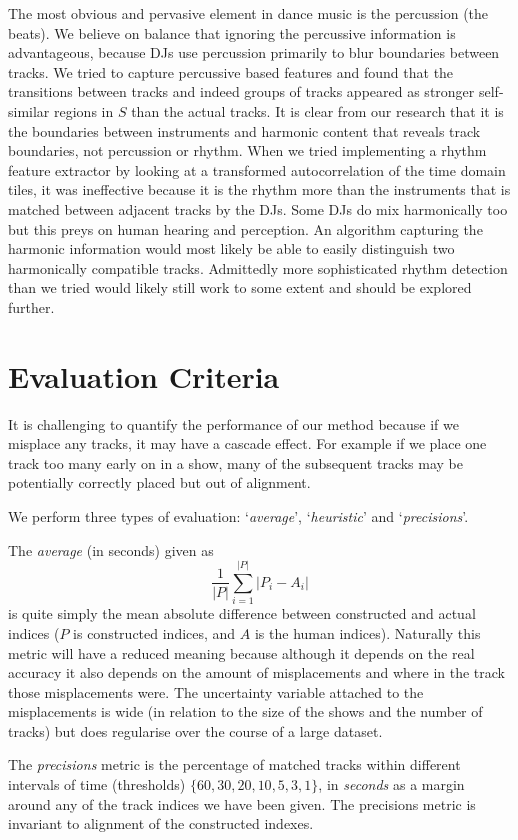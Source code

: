 \documentclass[twocolumn]{article}
\begin{document}
The most obvious and pervasive element in dance music is the percussion (the beats). We believe on balance that ignoring the percussive information is advantageous, because DJs use percussion primarily to blur boundaries between tracks.  We tried to capture percussive based features and found that the transitions between tracks and indeed groups of tracks appeared as stronger self-similar regions in $S$ than the actual tracks. It is clear from our research that it is the boundaries between instruments and harmonic content that reveals track boundaries, not percussion or rhythm. When we tried implementing a rhythm feature extractor by looking at a transformed autocorrelation of the time domain tiles, it was ineffective because it is the rhythm more than the instruments that is matched between adjacent tracks by the DJs. Some DJs do mix harmonically too but this preys on human hearing and perception. An algorithm capturing the harmonic information would most likely be able to easily distinguish two harmonically compatible tracks. Admittedly more sophisticated rhythm detection than we tried would likely still work to some extent and should be explored further. 


\section{Evaluation Criteria}\label{eval_crit}

It is challenging to quantify the performance of our method because if we misplace any tracks, it may have a cascade effect. For example if we place one track too many early on in a show, many of the subsequent tracks may be potentially correctly placed but out of alignment. 

We perform three types of evaluation: `\textit{average}', `\textit{heuristic}' and `\textit{precisions}'.


The \textit{average} (in seconds) given as $$\frac{1}{|P|}\sum_{i=1}^{|P|}{|P_i-A_i|}$$ is quite simply the mean absolute difference between constructed and actual indices ($P$ is constructed indices, and $A$ is the human indices). Naturally this metric will have a reduced meaning because although it depends on the real accuracy it also depends on the amount of misplacements and where in the track those misplacements were. The uncertainty variable attached to the misplacements is wide (in relation to the size of the shows and the number of tracks) but does regularise over the course of a large dataset.

The \textit{precisions} metric is the percentage of matched tracks within different intervals of time (thresholds) $\{60, 30, 20, 10, 5, 3, 1\}$, in \emph{seconds} as a margin around any of the track indices we have been given. The precisions metric is invariant to alignment of the constructed indexes.
\end{document}
